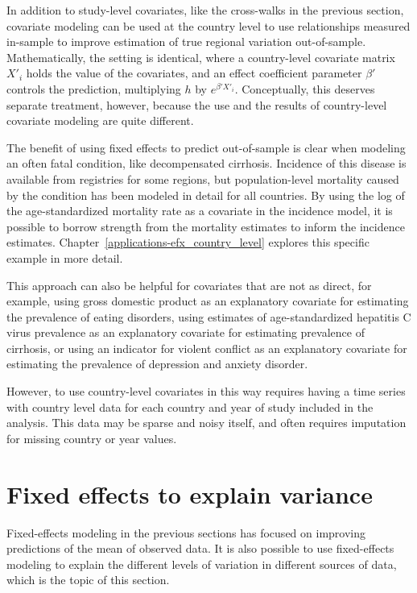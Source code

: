 In addition to study-level covariates, like the cross-walks in the
previous section, covariate modeling can be used at the country level
to use relationships measured in-sample to improve estimation of true
regional variation out-of-sample.  Mathematically, the setting is
identical, where a country-level covariate matrix $X'_i$ holds the
value of the covariates, and an effect coefficient parameter $\beta'$
controls the prediction, multiplying $h$ by $e^{\beta' X'_i}$.
Conceptually, this deserves separate treatment, however, because the
use and the results of country-level covariate modeling are quite different.

The benefit of using fixed effects to predict out-of-sample
is clear when modeling an often fatal condition, like
decompensated cirrhosis.  Incidence of this disease is available from
registries for some regions, but population-level mortality caused by
the condition has been modeled in detail for all
countries.\cite{foreman_modeling_2012} By using the log of the
age-standardized mortality rate as a covariate in the incidence model,
it is possible to borrow strength from the mortality estimates to
inform the incidence
estimates. Chapter~\ref{applications-efx_country_level} explores this
specific example in more detail.

This approach can also be helpful for covariates that are not as
direct, for example, using gross domestic product as an explanatory
covariate for estimating the prevalence of eating disorders, using
estimates of age-standardized hepatitis C virus prevalence as an
explanatory covariate for estimating prevalence of cirrhosis, or using
an indicator for violent conflict as an explanatory covariate for
estimating the prevalence of depression and anxiety disorder.

However, to use country-level covariates in this way requires having a
time series with country level data for each country and year of study
included in the analysis. This data may be sparse and noisy itself,
and often requires imputation for missing country or year values.


\section{Fixed effects to explain variance}
Fixed-effects modeling in the previous sections has focused on
improving predictions of the mean of observed data.  It is also
possible to use fixed-effects modeling to explain the
different levels of variation in different sources of data, which is
the topic of this section.

